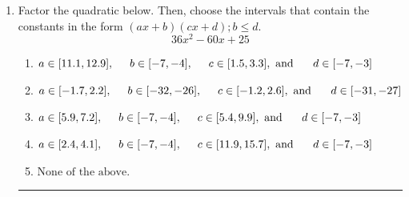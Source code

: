 \documentclass[14pt]{extbook}
\newcommand{\litem}[1]{\item#1\hspace*{-1cm}\rule{\textwidth}{0.4pt}}
\begin{document}
\begin{enumerate}
{\begin{enumerate}[label=\Alph*.]
\end{enumerate} }
\litem{
Factor the quadratic below. Then, choose the intervals that contain the constants in the form $(ax+b)(cx+d); b \leq d.$\[ 36x^{2} -60 x + 25 \]\begin{enumerate}[label=\Alph*.]
\item \( a \in [11.1, 12.9], \hspace*{5mm} b \in [-7, -4], \hspace*{5mm} c \in [1.5, 3.3], \text{ and } \hspace*{5mm} d \in [-7, -3] \)
\item \( a \in [-1.7, 2.2], \hspace*{5mm} b \in [-32, -26], \hspace*{5mm} c \in [-1.2, 2.6], \text{ and } \hspace*{5mm} d \in [-31, -27] \)
\item \( a \in [5.9, 7.2], \hspace*{5mm} b \in [-7, -4], \hspace*{5mm} c \in [5.4, 9.9], \text{ and } \hspace*{5mm} d \in [-7, -3] \)
\item \( a \in [2.4, 4.1], \hspace*{5mm} b \in [-7, -4], \hspace*{5mm} c \in [11.9, 15.7], \text{ and } \hspace*{5mm} d \in [-7, -3] \)
\item \( \text{None of the above.} \)


\end{enumerate}}
\end{enumerate}
\end{document}
